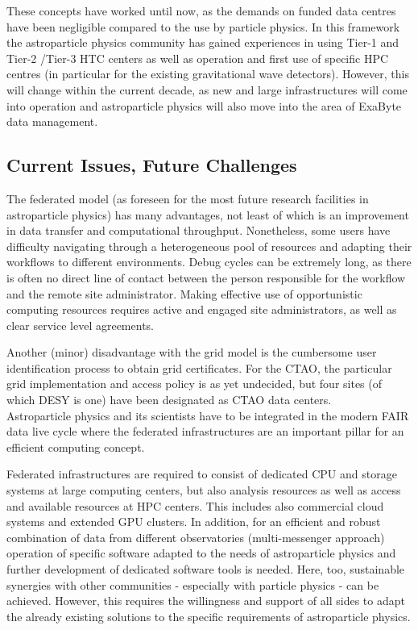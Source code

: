 These concepts have worked until now, as the demands on funded data centres have been negligible compared to the use by particle physics.
In this framework the astroparticle physics community has gained experiences in using Tier-1 and Tier-2 /Tier-3 HTC centers as well as operation and first use of specific HPC centres (in particular for the existing gravitational wave detectors).
However, this will change within the current decade, as new and large infrastructures will come into operation and astroparticle physics will also move into the area of ExaByte data management.


\subsection{Current Issues, Future Challenges}

The federated model (as foreseen for the most future research facilities in astroparticle physics) has many advantages, not least of which is an
improvement in data transfer and computational throughput. 
Nonetheless, some users have difficulty navigating through a heterogeneous pool of resources and adapting their workflows to different environments. 
Debug cycles can be extremely long, as there is often no direct line of contact between the person responsible for the workflow and the remote site administrator. 
Making effective use of opportunistic computing resources requires active and engaged site administrators, as well as clear service level agreements.

Another (minor) disadvantage with the grid model is the cumbersome user
identification process to obtain grid certificates. For the CTAO, the
particular grid implementation and access policy is as yet undecided, but
four sites (of which DESY is one) have been designated as CTAO data
centers. \\

Astroparticle physics and its scientists have to be integrated in the modern FAIR data live cycle where the federated infrastructures are an important pillar for an efficient computing concept.

Federated infrastructures are required to consist of dedicated CPU
and storage systems at large computing centers, but also analysis
resources as well as access and  available
resources at HPC centers.
This includes also commercial cloud systems and extended GPU clusters.
In addition, for an efficient and robust combination of data from different observatories (multi-messenger approach) operation
of specific software adapted to the needs of astroparticle physics and further development of dedicated software tools is needed.
Here, too, sustainable synergies with other communities - especially with particle physics - can be achieved. However, this requires the willingness  and support of all sides to adapt the already existing solutions to the specific requirements of astroparticle physics. 



